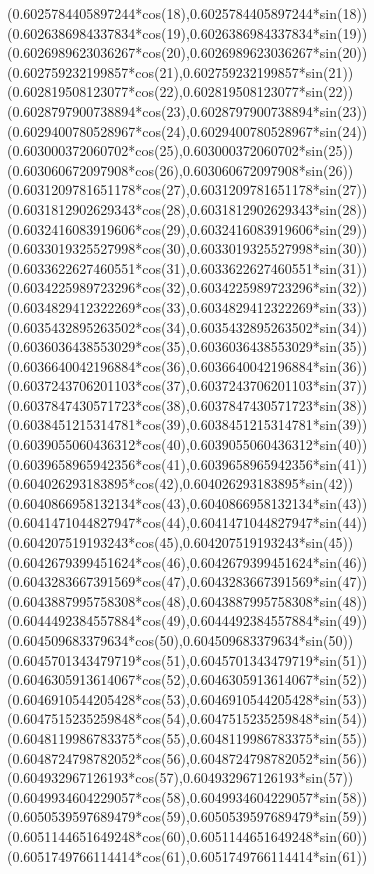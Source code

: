 {({0.6025784405897244*cos(18)},{0.6025784405897244*sin(18)})
({0.6026386984337834*cos(19)},{0.6026386984337834*sin(19)})
({0.6026989623036267*cos(20)},{0.6026989623036267*sin(20)})
({0.602759232199857*cos(21)},{0.602759232199857*sin(21)})
({0.602819508123077*cos(22)},{0.602819508123077*sin(22)})
({0.6028797900738894*cos(23)},{0.6028797900738894*sin(23)})
({0.6029400780528967*cos(24)},{0.6029400780528967*sin(24)})
({0.603000372060702*cos(25)},{0.603000372060702*sin(25)})
({0.603060672097908*cos(26)},{0.603060672097908*sin(26)})
({0.6031209781651178*cos(27)},{0.6031209781651178*sin(27)})
({0.6031812902629343*cos(28)},{0.6031812902629343*sin(28)})
({0.6032416083919606*cos(29)},{0.6032416083919606*sin(29)})
({0.6033019325527998*cos(30)},{0.6033019325527998*sin(30)})
({0.6033622627460551*cos(31)},{0.6033622627460551*sin(31)})
({0.6034225989723296*cos(32)},{0.6034225989723296*sin(32)})
({0.6034829412322269*cos(33)},{0.6034829412322269*sin(33)})
({0.6035432895263502*cos(34)},{0.6035432895263502*sin(34)})
({0.6036036438553029*cos(35)},{0.6036036438553029*sin(35)})
({0.6036640042196884*cos(36)},{0.6036640042196884*sin(36)})
({0.6037243706201103*cos(37)},{0.6037243706201103*sin(37)})
({0.6037847430571723*cos(38)},{0.6037847430571723*sin(38)})
({0.6038451215314781*cos(39)},{0.6038451215314781*sin(39)})
({0.6039055060436312*cos(40)},{0.6039055060436312*sin(40)})
({0.6039658965942356*cos(41)},{0.6039658965942356*sin(41)})
({0.604026293183895*cos(42)},{0.604026293183895*sin(42)})
({0.6040866958132134*cos(43)},{0.6040866958132134*sin(43)})
({0.6041471044827947*cos(44)},{0.6041471044827947*sin(44)})
({0.604207519193243*cos(45)},{0.604207519193243*sin(45)})
({0.6042679399451624*cos(46)},{0.6042679399451624*sin(46)})
({0.6043283667391569*cos(47)},{0.6043283667391569*sin(47)})
({0.6043887995758308*cos(48)},{0.6043887995758308*sin(48)})
({0.6044492384557884*cos(49)},{0.6044492384557884*sin(49)})
({0.604509683379634*cos(50)},{0.604509683379634*sin(50)})
({0.6045701343479719*cos(51)},{0.6045701343479719*sin(51)})
({0.6046305913614067*cos(52)},{0.6046305913614067*sin(52)})
({0.6046910544205428*cos(53)},{0.6046910544205428*sin(53)})
({0.6047515235259848*cos(54)},{0.6047515235259848*sin(54)})
({0.6048119986783375*cos(55)},{0.6048119986783375*sin(55)})
({0.6048724798782052*cos(56)},{0.6048724798782052*sin(56)})
({0.604932967126193*cos(57)},{0.604932967126193*sin(57)})
({0.6049934604229057*cos(58)},{0.6049934604229057*sin(58)})
({0.6050539597689479*cos(59)},{0.6050539597689479*sin(59)})
({0.6051144651649248*cos(60)},{0.6051144651649248*sin(60)})
({0.6051749766114414*cos(61)},{0.6051749766114414*sin(61)})
}
